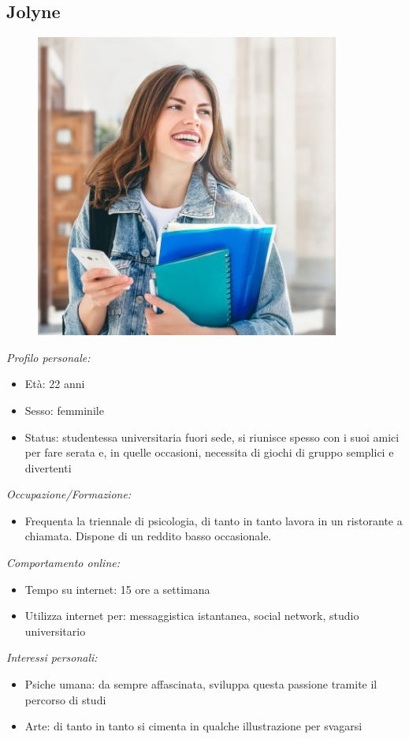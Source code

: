 \subsection{Jolyne}
\begin{figure}[H]
    \centering
    \includegraphics[width=100mm]{img/personas/jolyne.jpg}
    \label{fig:personas_jolyne}
\end{figure}
\textit{Profilo personale:}
\begin{itemize}
    \item Età: 22 anni
    \item Sesso: femminile
    \item Status: studentessa universitaria fuori sede, si riunisce spesso con i suoi amici per fare serata e, in quelle occasioni, necessita di giochi di gruppo semplici e divertenti
\end{itemize}
\textit{Occupazione/Formazione:}
\begin{itemize}
    \item Frequenta la triennale di psicologia, di tanto in tanto lavora in un ristorante a chiamata. Dispone di un reddito basso occasionale.
\end{itemize}
\textit{Comportamento online:}
\begin{itemize}
    \item Tempo su internet: 15 ore a settimana
    \item Utilizza internet per: messaggistica istantanea, social network, studio universitario
\end{itemize}
\textit{Interessi personali:}
\begin{itemize}
    \item Psiche umana: da sempre affascinata, sviluppa questa passione tramite il percorso di studi
    \item Arte: di tanto in tanto si cimenta in qualche illustrazione per svagarsi 
\end{itemize}
